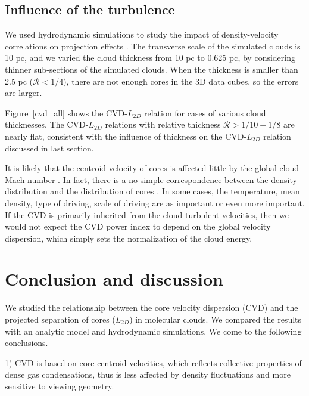\documentclass[iop,revtex4]{emulateapj}
\begin{document}
\subsection{Influence of the turbulence}

We used hydrodynamic simulations to study the impact of density-velocity correlations on projection effects \citep[e.g.][]{Brunt2004}. The transverse scale of the simulated clouds is 10 pc, and we varied the cloud thickness from 10 pc to 0.625 pc, by considering thinner sub-sections of the simulated clouds. When the thickness is smaller than 2.5 pc ($\mathcal{R}<1/4$), there are not enough cores in the 3D data cubes, so the errors are larger.


Figure~\ref{cvd_all} shows the CVD-$L_{2D}$ relation for cases of various cloud thicknesses. The CVD-$L_{2D}$ relations with relative thickness $\mathcal{R}>1/10-1/8$ are nearly flat, consistent with the influence of thickness on the CVD-$L_{2D}$ relation discussed in last section.



It is likely that the centroid velocity of cores is affected little by the global cloud Mach number \citep[see also][]{Offner2009}. In fact, there is a no simple correspondence between the density distribution and the distribution of cores \citep{Padoan2002}. In some cases, the temperature, mean density, type of driving, scale of driving are as important or even more important. If the CVD is primarily inherited from the cloud turbulent velocities, then we would not expect the CVD power index to depend on the global velocity dispersion, which simply sets the normalization of the cloud energy.






\section{Conclusion and discussion}
\label{sec:conclusion}
We studied the relationship between the core velocity dispersion (CVD) and the projected separation of cores ($L_{2D}$)  in molecular clouds. We compared the results with an analytic model and hydrodynamic  simulations. We come to the following conclusions.

1) CVD is based on core centroid velocities, which reflects collective properties of dense gas condensations, thus is less affected by density fluctuations
\cite[c.f.][]{Brunt2004} and more sensitive to viewing geometry.
\end{document}
